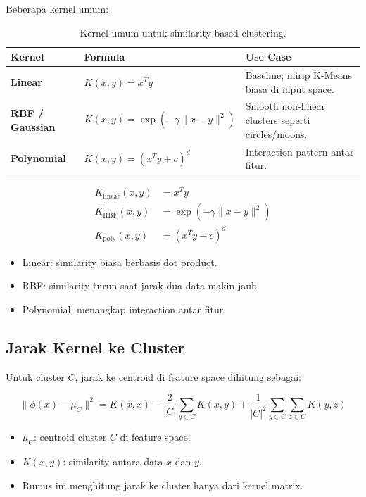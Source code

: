 \documentclass{article}
\begin{document}
Beberapa kernel umum:
\begin{table}[H]
\centering
{}
\begin{tabularx}{\textwidth}{>{\bfseries}lXX}
\rowcolor{tableHead}
Kernel & Formula & Use Case \\
\toprule
Linear & $K(x,y)=x^Ty$ & Baseline; mirip K-Means biasa di input space. \\
RBF / Gaussian & $K(x,y)=\exp(-\gamma\lVert x-y\rVert^2)$ & Smooth non-linear clusters seperti circles/moons. \\
Polynomial & $K(x,y)=(x^Ty+c)^d$ & Interaction pattern antar fitur. \\
\bottomrule
\end{tabularx}
\caption{Kernel umum untuk similarity-based clustering.}
\end{table}

\begin{align}
K_{\text{linear}}(x,y) &= x^T y \\
K_{\text{RBF}}(x,y) &= \exp\left(-\gamma\lVert x-y\rVert^2\right) \\
K_{\text{poly}}(x,y) &= (x^T y+c)^d
\end{align}
\begin{itemize}[leftmargin=*]
    \item Linear: similarity biasa berbasis dot product.
    \item RBF: similarity turun saat jarak dua data makin jauh.
    \item Polynomial: menangkap interaction antar fitur.
\end{itemize}

\subsection{Jarak Kernel ke Cluster}

Untuk cluster $C$, jarak ke centroid di feature space dihitung sebagai:

\begin{equation}
\lVert\phi(x)-\mu_C\rVert^2 =
K(x,x)-\frac{2}{|C|}\sum_{y\in C}K(x,y)
+\frac{1}{|C|^2}\sum_{y\in C}\sum_{z\in C}K(y,z)
\end{equation}
\begin{itemize}[leftmargin=*]
    \item $\mu_C$: centroid cluster $C$ di feature space.
    \item $K(x,y)$: similarity antara data $x$ dan $y$.
    \item Rumus ini menghitung jarak ke cluster hanya dari kernel matrix.
\end{itemize}
\end{document}
